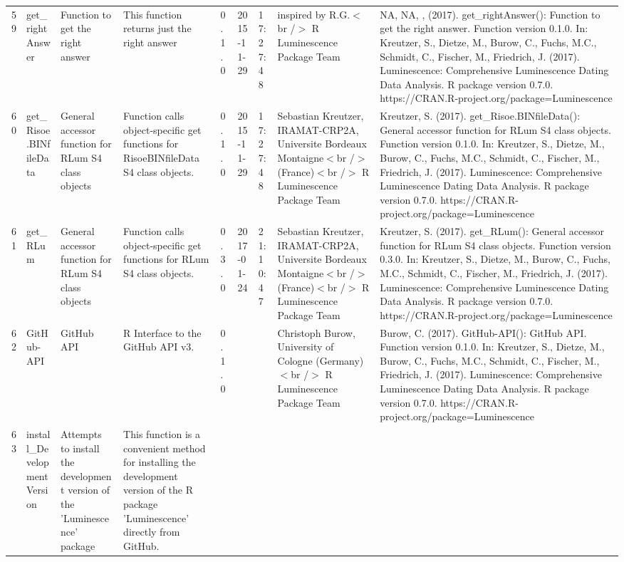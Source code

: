 \begin{table}[ht]
\begin{tabular}{rllllllll}
 \\ 
  59 & get\_rightAnswer & Function to get the right answer & This function returns just the right answer & 0.1.0 & 2015-11-29 & 17:27:48
 & inspired by R.G.$<$br /$>$  R Luminescence Package Team & NA, NA, ,  (2017). get\_rightAnswer(): Function to get the right answer. Function version 0.1.0. In: Kreutzer, S., Dietze, M., Burow, C., Fuchs, M.C., Schmidt, C., Fischer, M., Friedrich, J. (2017). Luminescence: Comprehensive Luminescence Dating Data Analysis. R package version 0.7.0. https://CRAN.R-project.org/package=Luminescence
 \\ 
  60 & get\_Risoe.BINfileData & General accessor function for RLum S4 class objects & Function calls object-specific get functions for RisoeBINfileData S4 class objects. & 0.1.0 & 2015-11-29 & 17:27:48
 & Sebastian Kreutzer, IRAMAT-CRP2A, Universite Bordeaux Montaigne$<$br /$>$ (France)$<$br /$>$  R Luminescence Package Team & Kreutzer, S. (2017). get\_Risoe.BINfileData(): General accessor function for RLum S4 class objects. Function version 0.1.0. In: Kreutzer, S., Dietze, M., Burow, C., Fuchs, M.C., Schmidt, C., Fischer, M., Friedrich, J. (2017). Luminescence: Comprehensive Luminescence Dating Data Analysis. R package version 0.7.0. https://CRAN.R-project.org/package=Luminescence
 \\ 
  61 & get\_RLum & General accessor function for RLum S4 class objects & Function calls object-specific get functions for RLum S4 class objects. & 0.3.0 & 2017-01-24 & 21:10:47
 & Sebastian Kreutzer, IRAMAT-CRP2A, Universite Bordeaux Montaigne$<$br /$>$ (France)$<$br /$>$  R Luminescence Package Team & Kreutzer, S. (2017). get\_RLum(): General accessor function for RLum S4 class objects. Function version 0.3.0. In: Kreutzer, S., Dietze, M., Burow, C., Fuchs, M.C., Schmidt, C., Fischer, M., Friedrich, J. (2017). Luminescence: Comprehensive Luminescence Dating Data Analysis. R package version 0.7.0. https://CRAN.R-project.org/package=Luminescence
 \\ 
  62 & GitHub-API & GitHub API & R Interface to the GitHub API v3. & 0.1.0
 &  &  & Christoph Burow, University of Cologne (Germany)$<$br /$>$  R Luminescence Package Team & Burow, C. (2017). GitHub-API(): GitHub API. Function version 0.1.0. In: Kreutzer, S., Dietze, M., Burow, C., Fuchs, M.C., Schmidt, C., Fischer, M., Friedrich, J. (2017). Luminescence: Comprehensive Luminescence Dating Data Analysis. R package version 0.7.0. https://CRAN.R-project.org/package=Luminescence
 \\ 
  63 & install\_DevelopmentVersion & Attempts to install the development version of the 'Luminescence' package & This function is a convenient method for installing the development version of the R package 'Luminescence' directly from GitHub. &  &  &  &  &  \\ 

\end{tabular}
\end{table}
